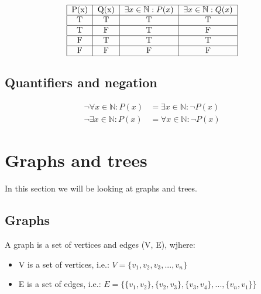 \documentclass{article}
\begin{document}
\begin{align*}
    \begin{tabular}{|c|c|c|c|}
        \hline
        P(x) & Q(x) & $\exists x \in \mathbb{N} : P(x)$ & $\exists x \in \mathbb{N} : Q(x)$ \\
        \hline
        T    & T    & T                                  & T                                \\
        \hline
        T    & F    & T                                  & F                                \\
        \hline
        F    & T    & T                                  & T                                \\
        \hline
        F    & F    & F                                  & F                                \\
        \hline
    \end{tabular}
\end{align*}

\subsection{Quantifiers and negation}

\begin{align*}
    \neg \forall x \in \mathbb{N} : P(x) & = \exists x \in \mathbb{N} : \neg P(x) \\
    \neg \exists x \in \mathbb{N} : P(x) & = \forall x \in \mathbb{N} : \neg P(x)
\end{align*}




\section{Graphs and trees}

In this section we will be looking at graphs and trees.

\subsection{Graphs}

A graph is a set of vertices and edges (V, E), wjhere:

\begin{itemize}
    \item V is a set of vertices, i.e.: $V = \{v_1, v_2, v_3, ..., v_n\}$
    \item E is a set of edges, i.e.: $E = \{\{v_1, v_2\}, \{v_2, v_3\}, \{v_3, v_4\}, ..., \{v_n, v_1\}\}$
\end{itemize}
\end{document}
